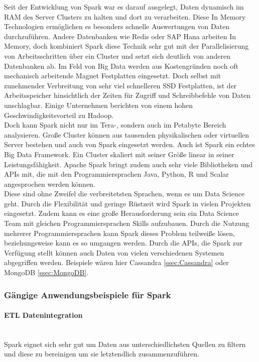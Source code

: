Seit der Entwicklung von Spark war es darauf ausgelegt, Daten dynamisch im RAM des Server Clusters zu halten und dort zu verarbeiten. Diese In Memory Technologien ermöglichen es besonders schnelle Auswertungen von Daten durchzuführen. Andere Datenbanken wie Redis oder SAP Hana arbeiten In Memory, doch kombiniert Spark diese Technik sehr gut mit der Parallelisierung von Arbeitsschritten über ein Cluster und setzt sich deutlich von anderen Datenbanken ab. Im Feld von Big Data werden aus Kostengründen noch oft mechanisch arbeitende Magnet Festplatten eingesetzt. Doch selbst mit zunehmender Verbreitung von sehr viel schnelleren SSD Festplatten, ist der Arbeitsspeicher hinsichtlich der Zeiten für Zugriff und Schreibbefehle von Daten unschlagbar. Einige Unternehmen berichten von einem hohen Geschwindigkeitsvorteil zu Hadoop.\\

Doch kann Spark nicht nur im Tera-, sondern auch im Petabyte Bereich analysieren. Große Cluster können aus tausenden physikalischen oder virtuellen Server bestehen und auch von Spark eingesetzt werden. Auch ist Spark ein echtes Big Data Framework. Ein Cluster skaliert mit seiner Größe linear in seiner Leistungsfähigkeit. Apache Spark bringt zudem auch sehr viele Bibliotheken und APIs mit, die mit den Programmiersprachen Java, Python, R und Scalar angesprochen werden können.\\

Diese sind ohne Zweifel die verbreitetsten Sprachen, wenn es um Data Science geht. Durch die Flexibilität und geringe Rüstzeit wird Spark in vielen Projekten eingesetzt. Zudem kann es eine große Herausforderung sein ein Data Science Team mit gleichen Programmiersprachen Skills aufzubauen. Durch die Nutzung mehrerer Programmiersprachen kann Spark dieses Problem teilweiße lösen, beziehungsweise kann es so umgangen werden. Durch die APIs, die Spark zur Verfügung stellt können auch Daten von vielen verschiedenen Systemen abgegriffen werden. Beispiele wären hier Cassandra \ref{ssec:Cassandra} oder MongoDB \ref{ssec:MongoDB}.
\subsubsection{Gängige Anwendungsbeispiele für Spark}
\paragraph{ETL Datenintegration}\mbox{} \\
Spark eignet sich sehr gut um Daten aus unterschiedlichsten Quellen zu filtern und diese zu bereinigen um sie letztendlich zusammenzuführen. 
